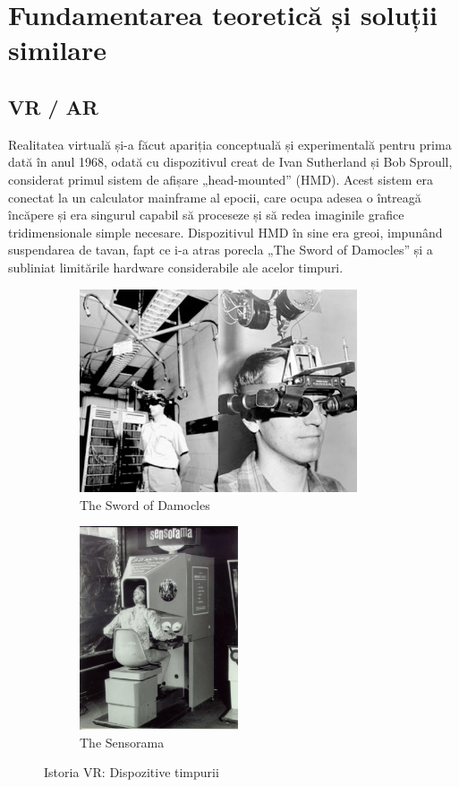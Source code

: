 \chapter{Fundamentarea teoretică și soluții similare}
\label{cap:cap2}

\section{VR / AR}

Realitatea virtuală și-a făcut apariția conceptuală și experimentală pentru prima dată în anul 1968, odată cu dispozitivul creat de Ivan Sutherland și Bob Sproull, considerat primul sistem de afișare „head-mounted” (HMD). Acest sistem era conectat la un calculator mainframe al epocii, care ocupa adesea o întreagă încăpere și era singurul capabil să proceseze și să redea imaginile grafice tridimensionale simple necesare. Dispozitivul HMD în sine era greoi, impunând suspendarea de tavan, fapt ce i-a atras porecla „The Sword of Damocles” și a subliniat limitările hardware considerabile ale acelor timpuri.

\begin{figure}[h!]
    \centering
    \begin{subfigure}{0.49\textwidth}
        \includegraphics[width=\linewidth, height=6cm]{continut/capitol2/figuri/sword_of_damocles.jpg}
        \caption{The Sword of Damocles}
        \label{fig:sword_of_damocles}
    \end{subfigure}
    \hfill
    \begin{subfigure}{0.49\textwidth}
        \includegraphics[width=\linewidth, height=6cm]{continut/capitol2/figuri/sensorama.jpg}
        \caption{The Sensorama}
        \label{fig:sensorama}
    \end{subfigure}

    \caption{Istoria VR: Dispozitive timpurii}
    \label{fig:VR_history}
\end{figure}


